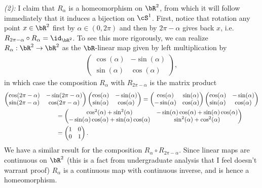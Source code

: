 \begin{homework}[e]
\begin{prf}
		\noindent \emph{(2):} \hspace{0.5em} I claim that $R_\alpha$ is a homeomorphism on $\bR^2$, from which it will follow immediately that it induces a bijection on $\cS^1$. First, notice that rotation any point $x \in \bR^2$ first by $\alpha \in (0,2\pi)$ and then by $2\pi - \alpha$ gives back $x$, i.e. $R_{2\pi - \alpha} \circ R_\alpha = \id_{\bR^2}$. To see this more rigorously, we can realize $R_\alpha:\bR^2\to \bR^2$ as the $\bR$-linear map given by left multiplication by
		\begin{align*}
			\begin{pmatrix}	
				\cos(\alpha) & -\sin(\alpha) \\
				\sin(\alpha) & \cos(\alpha)
			\end{pmatrix},
		\end{align*}
		in which case the composition $R_\alpha$ with $R_{2\pi - \alpha}$ is the matrix product
		\begin{align*}
			\begin{pmatrix}	
				\cos(2\pi - \alpha) & -\sin(2\pi - \alpha) \\
				\sin(2\pi - \alpha) & \cos(2\pi - \alpha)
			\end{pmatrix}&
			\begin{pmatrix}	
				\cos(\alpha) & -\sin(\alpha) \\
				\sin(\alpha) & \cos(\alpha)
			\end{pmatrix} = 
			\begin{pmatrix}	
				\cos(\alpha) & \sin(\alpha) \\
				-\sin(\alpha) & \cos(\alpha)
			\end{pmatrix}
			\begin{pmatrix}	
				\cos(\alpha) & -\sin(\alpha) \\
				\sin(\alpha) & \cos(\alpha)
			\end{pmatrix} \\
			&\hspace{-5em}= 
			\begin{pmatrix}	
				\cos^2(\alpha) + \sin^2(\alpha) & -\sin(\alpha)\cos(\alpha) + \sin(\alpha)\cos(\alpha) \\
				-\sin(\alpha)\cos(\alpha) + \sin(\alpha)\cos(\alpha) & \sin^2(\alpha)+\cos^2(\alpha)
			\end{pmatrix} \\
			&\hspace{-5em}= 
			\begin{pmatrix}	1 & 0 \\ 0 & 1 \end{pmatrix}.
		\end{align*}
		We have a similar result for the composition $R_\alpha\circ R_{2\pi - \alpha}$. Since linear maps are continuous on $\bR^2$ (this is a fact from undergraduate analysis that I feel doesn't warrant proof) $R_\alpha$ is a continuous map with continuous inverse, and is hence a homeomorphism.


\end{prf}
\end{homework}
